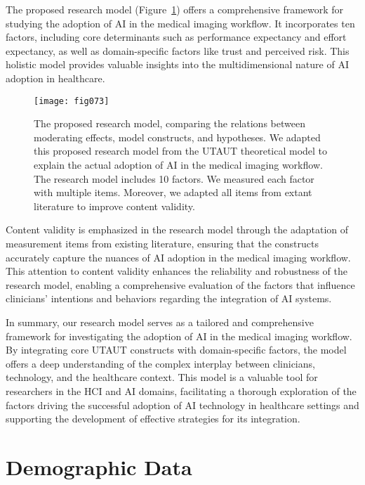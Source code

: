 The proposed research model (Figure~\ref{fig:fig073}) offers a comprehensive framework for studying the adoption of \ac{AI} in the medical imaging workflow.
It incorporates ten factors, including core determinants such as performance expectancy and effort expectancy, as well as domain-specific factors like trust and perceived risk.
This holistic model provides valuable insights into the multidimensional nature of \ac{AI} adoption in healthcare.

\begin{figure}[htbp]
\centering
\texttt{[image: fig073]}
\caption{The proposed research model, comparing the relations between moderating effects, model constructs, and hypotheses. We adapted this proposed research model from the UTAUT theoretical model to explain the actual adoption of AI in the medical imaging workflow. The research model includes 10 factors. We measured each factor with multiple items. Moreover, we adapted all items from extant literature to improve content validity.}
\label{fig:fig073}
\end{figure}

Content validity is emphasized in the research model through the adaptation of measurement items from existing literature, ensuring that the constructs accurately capture the nuances of \ac{AI} adoption in the medical imaging workflow.
This attention to content validity enhances the reliability and robustness of the research model, enabling a comprehensive evaluation of the factors that influence clinicians' intentions and behaviors regarding the integration of \ac{AI} systems.

In summary, our research model serves as a tailored and comprehensive framework for investigating the adoption of \ac{AI} in the medical imaging workflow.
By integrating core \ac{UTAUT} constructs with domain-specific factors, the model offers a deep understanding of the complex interplay between clinicians, technology, and the healthcare context.
This model is a valuable tool for researchers in the \ac{HCI} and \ac{AI} domains, facilitating a thorough exploration of the factors driving the successful adoption of \ac{AI} technology in healthcare settings and supporting the development of effective strategies for its integration.

\section{Demographic Data}
\label{chap:app003003}

